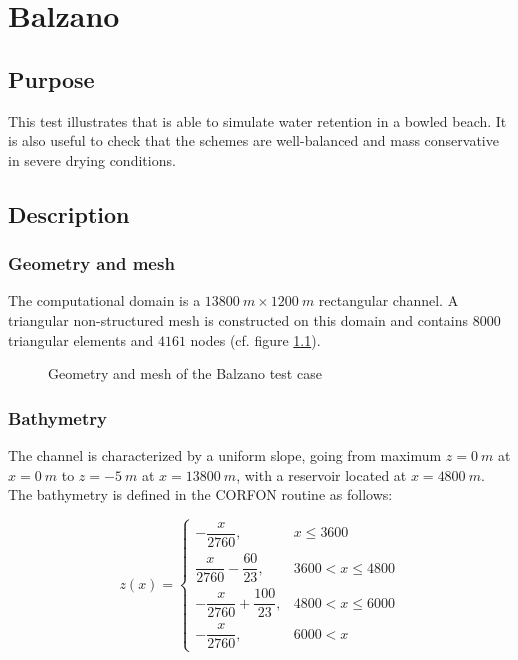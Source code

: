 
\chapter{Balzano}
%

\section{Purpose}
%
This test illustrates that  is able to simulate water retention in a bowled beach.
It is also useful to check that the schemes are well-balanced and 
mass conservative in severe drying conditions.


%
\section{Description}

\subsection{Geometry and mesh}
\label{subsection:balzano:bathy}

The computational domain is a $13800~m \times 1200~m$ rectangular channel.
A triangular non-structured mesh is constructed on this domain and contains $8000$ triangular elements
and $4161$ nodes (cf. figure \ref{fig:balzano:mesh}).

\begin{figure}[H]
  \centering
  \caption{Geometry and mesh of the Balzano test case}\label{fig:balzano:mesh}
\end{figure}

\subsection{Bathymetry}

The channel is characterized by a uniform slope,
going from maximum $z=0~m$ at $x=0~m$ to $z=-5~m$ at $x=13800~m$, with a reservoir located at $x=4800~m$.
The bathymetry is defined in the CORFON routine as follows:

\begin{equation}
   z(x) =
    \begin{cases}
      -\dfrac{x}{2760} ,& x \leq 3600\\
       \dfrac{x}{2760} - \dfrac{60}{23} ,&  3600 < x \leq 4800\\
       -\dfrac{x}{2760} + \dfrac{100}{23} ,& 4800 < x \leq 6000 \\
       -\dfrac{x}{2760} ,& 6000 < x
    \end{cases}
    \label{eq:balzano:analytical}
\end{equation}

